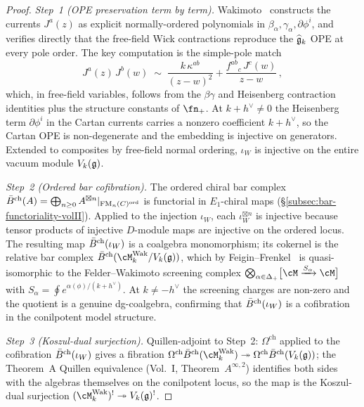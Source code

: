 \begin{proof}
\emph{Step~1 (OPE preservation term by term).}
Wakimoto~\cite{Wakimoto86} constructs the currents $J^a(z)$
as explicit normally-ordered polynomials in
$\beta_\alpha, \gamma_\alpha, \partial\phi^i$, and verifies
directly that the free-field Wick contractions reproduce the
$\widehat{\mathfrak{g}}_k$ OPE at every pole order. The key
computation is the simple-pole match
\[
J^a(z)\,J^b(w) \;\sim\;
 \frac{k\,\kappa^{ab}}{(z-w)^2}
 + \frac{f^{ab}{}_c\,J^c(w)}{z-w}\,,
\]
which, in free-field variables, follows from the
$\beta\gamma$ and Heisenberg contraction identities plus the
structure constants of $\fn_+$. At $k+h^\vee \neq 0$ the
Heisenberg term $\partial\phi^i$ in the Cartan currents carries
a nonzero coefficient $k+h^\vee$, so the Cartan OPE is
non-degenerate and the embedding is injective on generators.
Extended to composites by free-field normal ordering, $\iota_W$
is injective on the entire vacuum module
$V_k(\mathfrak{g})$.

\emph{Step~2 (Ordered bar cofibration).}
The ordered chiral bar complex
$\bar{B}^{\mathrm{ch}}(A) = \bigoplus_{n \geq 0}
A^{\boxtimes n}|_{\mathrm{FM}_n(C)^{\mathrm{ord}}}$
is functorial in $E_1$-chiral maps
(\S\ref{subsec:bar-functoriality-volII}). Applied to the
injection $\iota_W$, each $\iota_W^{\boxtimes n}$ is injective
because tensor products of injective $D$-module maps are
injective on the ordered locus. The resulting map
$\bar{B}^{\mathrm{ch}}(\iota_W)$ is a coalgebra monomorphism; its cokernel
is the relative bar complex
$\barBch(\cM_k^{\mathrm{Wak}} / V_k(\fg))$, which by
Feigin--Frenkel~\cite{FF90} is quasi-isomorphic to the
Felder--Wakimoto screening complex
$\bigotimes_{\alpha \in \Delta_+} \bigl[\cM \xrightarrow{S_\alpha}
\cM\bigr]$ with $S_\alpha = \oint e^{\alpha(\phi)/(k+h^\vee)}$.
At $k \neq -h^\vee$ the screening charges are non-zero and
the quotient is a genuine dg-coalgebra, confirming that
$\bar{B}^{\mathrm{ch}}(\iota_W)$ is a cofibration in the conilpotent model
structure.

\emph{Step~3 (Koszul-dual surjection).}
Quillen-adjoint to Step~2: $\Omega^{\mathrm{ch}}$ applied to
the cofibration $\bar{B}^{\mathrm{ch}}(\iota_W)$ gives a fibration
$\Omega^{\mathrm{ch}}\barBch(\cM_k^{\mathrm{Wak}})
\twoheadrightarrow \Omega^{\mathrm{ch}}\barBch(V_k(\fg))$;
the Theorem~A Quillen equivalence
(Vol.~I, Theorem~\(A^{\infty,2}\)) identifies both sides with
the algebras themselves on the conilpotent locus, so the map
is the Koszul-dual surjection
$(\cM_k^{\mathrm{Wak}})^! \twoheadrightarrow V_k(\fg)^!$.


\end{proof}
